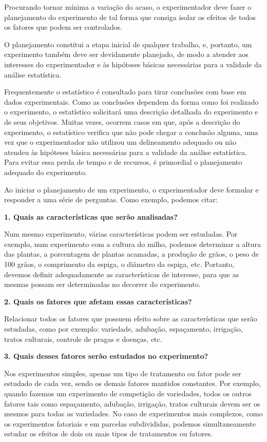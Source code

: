 \documentclass[
]{book}
\begin{document}
Procurando tornar mínima a variação do acaso, o experimentador deve fazer o planejamento do experimento de tal forma que consiga isolar os efeitos de todos os fatores que podem ser controlados.

O planejamento constitui a etapa inicial de qualquer trabalho, e, portanto, um experimento também deve ser devidamente planejado, de modo a atender aos interesses do experimentador e às hipóteses básicas necessárias para a validade da análise estatística.

Frequentemente o estatístico é consultado para tirar conclusões com base em dados experimentais. Como as conclusões dependem da forma como foi realizado o experimento, o estatístico solicitará uma descrição detalhada do experimento e de seus objetivos. Muitas vezes, ocorrem casos em que, após a descrição do experimento, o estatístico verifica que não pode chegar a conclusão alguma, uma vez que o experimentador não utilizou um delineamento adequado ou não atendeu às hipóteses básica necessárias para a validade da análise estatística. Para evitar essa perda de tempo e de recursos, é primordial o planejamento adequado do experimento.

Ao iniciar o planejamento de um experimento, o experimentador deve formular e responder a uma série de perguntas. Como exemplo, podemos citar:

\textbf{1. Quais as características que serão analisadas?}

Num mesmo experimento, várias características podem ser estudadas. Por exemplo, num experimento com a cultura do milho, podemos determinar a altura das plantas, a porcentagem de plantas acamadas, a produção de grãos, o peso de 100 grãos, o comprimento da espiga, o diâmetro da espiga, etc. Portanto, devemos definir adequadamente as características de interesse, para que as mesmas possam ser determinadas no decorrer do experimento.

\textbf{2. Quais os fatores que afetam essas características?}

Relacionar todos os fatores que possuem efeito sobre as características que serão estudadas, como por exemplo: variedade, adubação, espaçamento, irrigação, tratos culturais, controle de pragas e doenças, etc.

\textbf{3. Quais desses fatores serão estudados no experimento?}

Nos experimentos simples, apenas um tipo de tratamento ou fator pode ser estudado de cada vez, sendo os demais fatores mantidos constantes. Por exemplo, quando fazemos um experimento de competição de variedades, todos os outros fatores tais como espaçamento, adubação, irrigação, tratos culturais devem ser os mesmos para todas as variedades. No caso de experimentos mais complexos, como os experimentos fatoriais e em parcelas subdivididas, podemos simultaneamente estudar os efeitos de dois ou mais tipos de tratamentos ou fatores.
\end{document}
